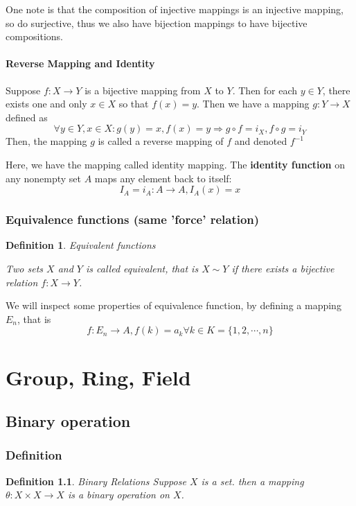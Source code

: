 \documentclass{book}
\newtheorem{Definition}{Definition}[section]
\numberwithin{identity}{subsection}
\numberwithin{Rule}{subsection}
\numberwithin{Theorem}{subsection}
\numberwithin{Definition}{subsection}
\begin{document}
One note is that the composition of injective mappings is an injective mapping, so do surjective, thus we also have bijection mappings to have bijective compositions. 

\subsubsection{Reverse Mapping and Identity}
Suppose $f: X \longrightarrow Y$ is a bijective mapping from $X$ to $Y$. Then for each $y \in Y$, there exists one and only $x\in X$ so that $f(x)=y$. Then we have a mapping $g: Y \longrightarrow X$ defined as $$\forall y \in Y, x \in X: g(y) = x, f(x) = y \Longrightarrow g \circ f= i_{X}, f \circ g = i_{Y}$$
Then, the mapping $g$ is called a reverse mapping of $f$ and denoted $f^{-1}$

Here, we have the mapping called identity mapping. The \textbf{identity function} on any nonempty set $A$ maps any element back to itself: $$I_{A}=i_{A}:A \longrightarrow A, I_{A}(x)=x$$

\subsection{Equivalence functions (same 'force' relation)}

\begin{Definition} Equivalent functions

    Two sets $X$ and $Y$ is called equivalent, that is $X \sim Y$ if there exists a bijective relation $f: X \longrightarrow Y$. 
\end{Definition}

We will inspect some properties of equivalence function, by defining a mapping $E_{n}$, that is $$f: E_{n}\rightarrow A, f(k)=a_{k} \forall k \in K=\{1, 2,\cdots, n\}$$

\chapter{Group, Ring, Field}

\section{Binary operation}
\subsection{Definition}

\begin{Definition} Binary Relations
    Suppose $X$ is a set. then a mapping $\theta: X \times X \longrightarrow X$ is a binary operation on $X$.
\end{Definition}
\end{document}
